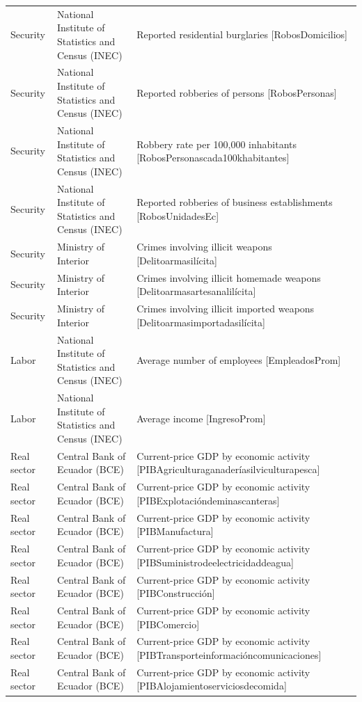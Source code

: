 \documentclass[10pt,a4paper]{article}
\begin{document}
\begin{longtable}{@{}>{\raggedright\arraybackslash}p{3.5cm}>{\raggedright\arraybackslash}p{5.6cm}>{\raggedright\arraybackslash}p{\dimexpr\textwidth-9.1cm-4\tabcolsep\relax}@{}}
Security & National Institute of Statistics and Census (INEC) & Reported residential burglaries [RobosDomicilios]\\
Security & National Institute of Statistics and Census (INEC) & Reported robberies of persons [RobosPersonas]\\
Security & National Institute of Statistics and Census (INEC) & Robbery rate per 100,000 inhabitants [RobosPersonascada100khabitantes]\\
Security & National Institute of Statistics and Census (INEC) & Reported robberies of business establishments [RobosUnidadesEc]\\
Security & Ministry of Interior & Crimes involving illicit weapons [Delitoarmasil\'{i}cita]\\
Security & Ministry of Interior & Crimes involving illicit homemade weapons [Delitoarmasartesanalil\'{i}cita]\\
Security & Ministry of Interior & Crimes involving illicit imported weapons [Delitoarmasimportadasil\'{i}cita]\\
Labor & National Institute of Statistics and Census (INEC) & Average number of employees [EmpleadosProm]\\
Labor & National Institute of Statistics and Census (INEC) & Average income [IngresoProm]\\
Real sector & Central Bank of Ecuador (BCE) & Current-price GDP by economic activity [PIBAgriculturaganader\'{i}asilviculturapesca]\\
Real sector & Central Bank of Ecuador (BCE) & Current-price GDP by economic activity [PIBExplotaci\'{o}ndeminascanteras]\\
Real sector & Central Bank of Ecuador (BCE) & Current-price GDP by economic activity [PIBManufactura]\\
Real sector & Central Bank of Ecuador (BCE) & Current-price GDP by economic activity [PIBSuministrodeelectricidaddeagua]\\
Real sector & Central Bank of Ecuador (BCE) & Current-price GDP by economic activity [PIBConstrucci\'{o}n]\\
Real sector & Central Bank of Ecuador (BCE) & Current-price GDP by economic activity [PIBComercio]\\
Real sector & Central Bank of Ecuador (BCE) & Current-price GDP by economic activity [PIBTransporteinformaci\'{o}ncomunicaciones]\\
Real sector & Central Bank of Ecuador (BCE) & Current-price GDP by economic activity [PIBAlojamientoserviciosdecomida]\\

\end{longtable}
\end{document}
